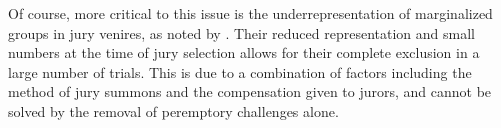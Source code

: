 Of course, more critical to this issue is the underrepresentation of marginalized groups in jury venires, as noted by \cite{vandykejurysel}. Their reduced representation and small numbers at the time of jury selection allows for their complete exclusion in a large number of trials. This is due to a combination of factors including the method of jury summons and the compensation given to jurors, and cannot be solved by the removal of peremptory challenges alone.
